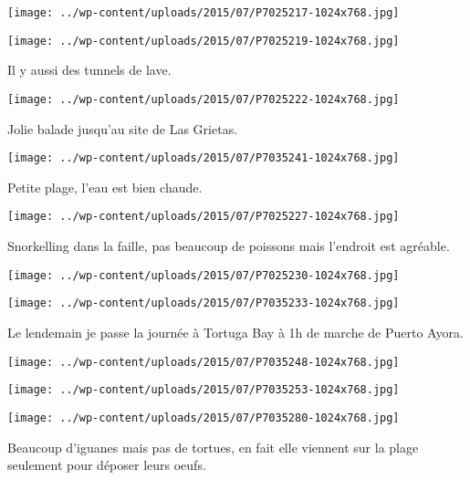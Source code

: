  \newline
 \newline
\centerline{\texttt{[image: ../wp-content/uploads/2015/07/P7025217-1024x768.jpg]} } 
\newline
\centerline{\texttt{[image: ../wp-content/uploads/2015/07/P7025219-1024x768.jpg]} } 
 \newline
 Il y aussi des tunnels de lave. \newline
 \newline
\centerline{\texttt{[image: ../wp-content/uploads/2015/07/P7025222-1024x768.jpg]} } 
 \newline
 Jolie balade jusqu'au site de Las Grietas. \newline
 \newline
\centerline{\texttt{[image: ../wp-content/uploads/2015/07/P7035241-1024x768.jpg]} } 
 \newline
 Petite plage, l'eau est bien chaude. \newline
 \newline
\centerline{\texttt{[image: ../wp-content/uploads/2015/07/P7025227-1024x768.jpg]} } 
 \newline
 Snorkelling dans la faille, pas beaucoup de poissons mais l'endroit est agréable. \newline
 \newline
\centerline{\texttt{[image: ../wp-content/uploads/2015/07/P7025230-1024x768.jpg]} } 
 \newline
 \newline
\centerline{\texttt{[image: ../wp-content/uploads/2015/07/P7035233-1024x768.jpg]} } 
 \newline
 Le lendemain je passe la journée à Tortuga Bay à 1h de marche de Puerto Ayora. \newline
 \newline
\centerline{\texttt{[image: ../wp-content/uploads/2015/07/P7035248-1024x768.jpg]} } 
 \newline
 \newline
\centerline{\texttt{[image: ../wp-content/uploads/2015/07/P7035253-1024x768.jpg]} } 
 \newline
 \newline
\centerline{\texttt{[image: ../wp-content/uploads/2015/07/P7035280-1024x768.jpg]} } 
 \newline
 Beaucoup d'iguanes mais pas de tortues, en fait elle viennent sur la plage seulement pour déposer leurs oeufs. \newline
